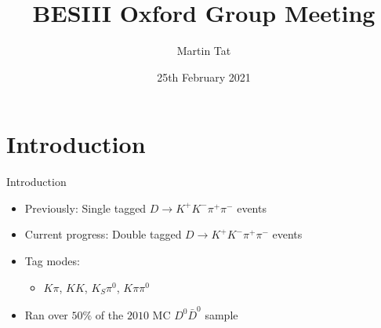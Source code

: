 \documentclass{beamer}
\title[BESIII Oxford]{BESIII Oxford Group Meeting}
\author{Martin Tat}
\institute{Oxford LHCb}
\date{25th February 2021}
\begin{document}
\begin{frame}
  \titlepage
\end{frame}


\section{Introduction}
\begin{frame}{Introduction}
  \begin{itemize}
    \item{Previously: Single tagged $D\to K^+K^-\pi^+\pi^-$ events}
    \item{Current progress: Double tagged $D\to K^+K^-\pi^+\pi^-$ events}
    \item{Tag modes:}
    \begin{itemize}
      \item{$K\pi$, $KK$, $K_S\pi^0$, $K\pi\pi^0$}
    \end{itemize}
    \item{Ran over $50\%$ of the $2010$ MC $D^0\bar{D}^0$ sample}
  \end{itemize}
\end{frame}
\end{document}
